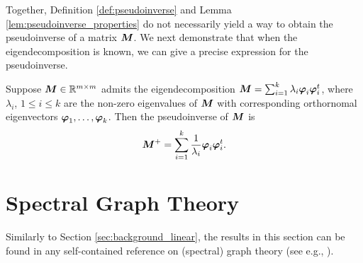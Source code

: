 Together, Definition \ref{def:pseudoinverse} and Lemma \ref{lem:pseudoinverse_properties} do not necessarily yield a way to obtain the pseudoinverse of a matrix ${\vb*{M}}$. We  next demonstrate that when the eigendecomposition is known, we  can give a precise expression for the pseudoinverse. 

\begin{lemma}
\label{lem:pseudoinverse_eigendecomposition}
Suppose ${\vb*{M}}\in\mathbb{R}^{m\times m}$ admits the eigendecomposition 
${\vb*{M}}=\sum_{i=1}^k \lambda_i \vb*{\varphi}_i\vb*{\varphi}_i^t$, 
where $\lambda_i$, $1\leq i\leq k$ are the non-zero eigenvalues of ${\vb*{M}}$ with corresponding orthornomal eigenvectors $\vb*{\varphi}_1,\dots,\vb*{\varphi}_k$. Then the pseudoinverse of ${\vb*{M}}$ is 
\begin{equation}
    \label{eq:pseudoinverse}
    {\vb*{M}}^+=\sum_{i=1}^k \frac{1}{\lambda_i}\vb*{\varphi}_i\vb*{\varphi}_i^t.
\end{equation}
\end{lemma}


\section{Spectral Graph Theory}
\label{sec:background_spectral}

Similarly to  Section \ref{sec:background_linear}, the results in this section can be found in any self-contained reference on (spectral) graph theory (see e.g., \cite{spielman2009spectral,chung1997spectral}).

